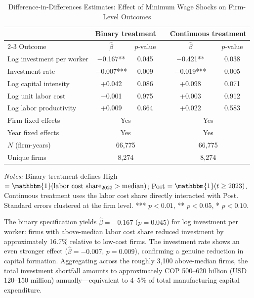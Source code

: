 \documentclass[5p,times,authoryear]{elsarticle}
\begin{document}
\begin{table}[htbp]
\centering
\begin{threeparttable}
\caption{Difference-in-Differences Estimates: Effect of Minimum Wage Shocks on Firm-Level Outcomes}
\label{tab:did_main}
\small
\setlength{\tabcolsep}{5pt}
\begin{tabular}{@{}lccccc@{}}
\toprule
& \multicolumn{2}{c}{Binary treatment} & & \multicolumn{2}{c}{Continuous treatment} \\
\cmidrule{2-3} \cmidrule{5-6}
Outcome & $\hat{\beta}$ & $p$-value & & $\hat{\beta}$ & $p$-value \\
\midrule
Log investment per worker & $-$0.167** & 0.045 & & $-$0.421** & 0.038 \\
Investment rate & $-$0.007*** & 0.009 & & $-$0.019*** & 0.005 \\
Log capital intensity & +0.042 & 0.086 & & +0.098 & 0.071 \\
Log unit labor cost & $-$0.001 & 0.975 & & +0.003 & 0.912 \\
Log labor productivity & +0.009 & 0.664 & & +0.022 & 0.583 \\
\midrule
Firm fixed effects & \multicolumn{2}{c}{Yes} & & \multicolumn{2}{c}{Yes} \\
Year fixed effects & \multicolumn{2}{c}{Yes} & & \multicolumn{2}{c}{Yes} \\
$N$ (firm-years) & \multicolumn{2}{c}{66,775} & & \multicolumn{2}{c}{66,775} \\
Unique firms & \multicolumn{2}{c}{8,274} & & \multicolumn{2}{c}{8,274} \\
\bottomrule
\end{tabular}
\begin{tablenotes}
\footnotesize
\item \textit{Notes:} Binary treatment defines High $= \mathbbm{1}(\text{labor cost share}_{2022} > \text{median})$; Post $= \mathbbm{1}(t \geq 2023)$. Continuous treatment uses the labor cost share directly interacted with Post. Standard errors clustered at the firm level. *** $p<0.01$, ** $p<0.05$, * $p<0.10$.
\end{tablenotes}
\end{threeparttable}
\end{table}

The binary specification yields $\hat{\beta} = -0.167$ ($p = 0.045$) for log investment per worker: firms with above-median labor cost share reduced investment by approximately 16.7\% relative to low-cost firms. The investment rate shows an even stronger effect ($\hat{\beta} = -0.007$, $p = 0.009$), confirming a genuine reduction in capital formation. Aggregating across the roughly 3,100 above-median firms, the total investment shortfall amounts to approximately COP 500--620 billion (USD 120--150 million) annually---equivalent to 4--5\% of total manufacturing capital expenditure.
\end{document}
